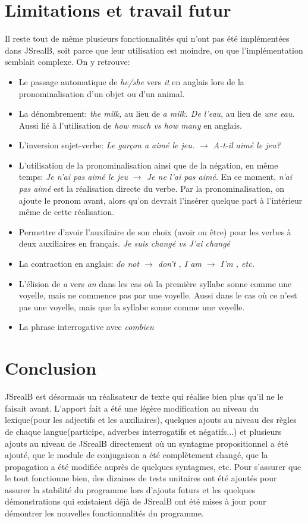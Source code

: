 \documentclass[11pt]{article} %
\begin{document}
\section{Limitations et travail futur}
Il reste tout de même plusieurs fonctionnalités qui n'ont pas été
implémentées dans JSrealB, soit parce que leur utilisation est moindre,
ou que l'implémentation semblait complexe. On y retrouve:
\begin{itemize}
\item Le passage automatique de \emph{he/she} vers \emph{it} en anglais
lors de la pronominalisation d'un objet ou d'un animal.
\item La dénombrement: \emph{the milk, }au lieu de \emph{a milk. De l'eau},
au lieu de \emph{une eau. }Aussi lié à l'utilisation de \emph{how much
vs how many }en anglais.
\item L'inversion sujet-verbe: \emph{Le garçon a aimé le jeu. $\rightarrow$ A-t-il
aimé le jeu?}
\item L'utilisation de la pronominalisation ainsi que de la négation, en
même temps: \emph{Je n'ai pas aimé le jeu $\rightarrow$ Je ne l'ai pas aimé.
}En ce moment, \emph{n'ai pas aimé} est la réalisation directe du
verbe. Par la pronominalisation, on ajoute le pronom avant, alors
qu'on devrait l'insérer quelque part à l'intérieur même de cette réalisation.
\item Permettre d'avoir l'auxiliaire de son choix (avoir ou être) pour les
verbes à deux auxiliaires en français. \emph{Je suis changé vs J'ai
changé}

\item La contraction en anglais: \emph{do not $\rightarrow$ don't , I am $\rightarrow$ I'm , etc.}
\item L'élision de \emph{a} vers \emph{an} dans les cas où la première syllabe sonne comme une voyelle,
mais ne commence pas par une voyelle. Aussi dans le cas où ce n'est pas une voyelle, mais que la syllabe
sonne comme une voyelle.
\item La phrase interrogative avec \emph{combien}
\end{itemize}
\section{Conclusion}
JSrealB est désormais un réalisateur de texte qui réalise bien plus
qu'il ne le faisait avant. L'apport fait a été une légère
modification au niveau du lexique(pour les adjectifs et les auxiliaires),
quelques ajouts au niveau des règles de chaque langue(participe, adverbes
interrogatifs et négatifs...) et plusieurs ajouts au niveau de JSrealB
directement où un syntagme propositionnel a été ajouté, que le module
de conjugaison a été complètement changé, que la propagation a été
modifiée auprès de quelques syntagmes, etc. Pour s'assurer que le
tout fonctionne bien, des dizaines de tests unitaires ont été ajoutés pour assurer
la stabilité du programme lors d'ajouts futurs et les quelques démonstrations
qui existaient déjà de JSrealB ont été mises à jour pour démontrer
les nouvelles fonctionnalités du programme.
\end{document}
